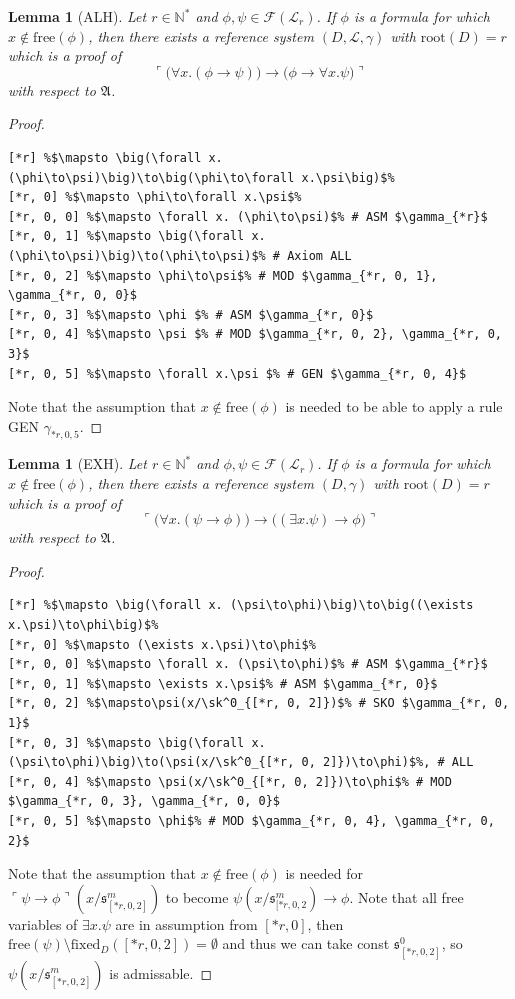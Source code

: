 \documentclass[10pt]{article}
\theoremstyle{plain}
\newtheorem{lemma}[theorem]{Lemma}
\newcommand{\free}{\text{free}}
\newcommand{\sk}{\mathfrak{s}}
\newcommand{\N}{\mathbb{N}}
\newcommand{\F}{\mathcal{F}}
\renewcommand{\root}{\text{root}}
\renewcommand{\L}{\mathscr{L}}
\newcommand{\fixed}{\text{fixed}}
\begin{document}
\begin{lemma}[ALH]
\label{ALH}
Let $r\in \N^*$ and $\phi, \psi\in \F(\L_r)$.
If $\phi$ is a formula for which $x\not\in \text{free}(\phi)$, then there exists
a reference system $(D, \L, \gamma)$ with $\root(D) = r$ which is a proof of 
\begin{equation}
\ulcorner \big(\forall x. (\phi\to\psi)\big)\to\big(\phi\to\forall x.\psi\big) \urcorner
\end{equation}
with respect to $\mathfrak{A}$. 
\end{lemma}
\begin{proof}
\begin{lstlisting}[texcl, escapechar=\%]
[*r] %$\mapsto \big(\forall x. (\phi\to\psi)\big)\to\big(\phi\to\forall x.\psi\big)$%
[*r, 0] %$\mapsto \phi\to\forall x.\psi$%
[*r, 0, 0] %$\mapsto \forall x. (\phi\to\psi)$% # ASM $\gamma_{*r}$
[*r, 0, 1] %$\mapsto \big(\forall x. (\phi\to\psi)\big)\to(\phi\to\psi)$% # Axiom ALL
[*r, 0, 2] %$\mapsto \phi\to\psi$% # MOD $\gamma_{*r, 0, 1}, \gamma_{*r, 0, 0}$
[*r, 0, 3] %$\mapsto \phi $% # ASM $\gamma_{*r, 0}$
[*r, 0, 4] %$\mapsto \psi $% # MOD $\gamma_{*r, 0, 2}, \gamma_{*r, 0, 3}$
[*r, 0, 5] %$\mapsto \forall x.\psi $% # GEN $\gamma_{*r, 0, 4}$
\end{lstlisting}
Note that the assumption that $x\not\in \text{free}(\phi)$ is needed to be able to apply a rule GEN $\gamma_{*r, 0, 5}$.
\end{proof}

\begin{lemma}[EXH]
\label{EXH}
Let $r\in \N^*$ and $\phi, \psi\in \F(\L_r)$.
If $\phi$ is a formula for which $x\not\in \text{free}(\phi)$, then there exists
a reference system $(D, \gamma)$ with $\root(D) = r$ which is a proof of 
\begin{equation}
\ulcorner \big(\forall x. (\psi\to\phi)\big)\to\big((\exists x.\psi)\to\phi\big) \urcorner 
\end{equation}
with respect to $\mathfrak{A}$. 
\end{lemma}
\begin{proof}
\begin{lstlisting}[texcl, escapechar=\%]
[*r] %$\mapsto \big(\forall x. (\psi\to\phi)\big)\to\big((\exists x.\psi)\to\phi\big)$%
[*r, 0] %$\mapsto (\exists x.\psi)\to\phi$%
[*r, 0, 0] %$\mapsto \forall x. (\psi\to\phi)$% # ASM $\gamma_{*r}$
[*r, 0, 1] %$\mapsto \exists x.\psi$% # ASM $\gamma_{*r, 0}$
[*r, 0, 2] %$\mapsto\psi(x/\sk^0_{[*r, 0, 2]})$% # SKO $\gamma_{*r, 0, 1}$
[*r, 0, 3] %$\mapsto \big(\forall x. (\psi\to\phi)\big)\to(\psi(x/\sk^0_{[*r, 0, 2]})\to\phi)$%, # ALL
[*r, 0, 4] %$\mapsto \psi(x/\sk^0_{[*r, 0, 2]})\to\phi$% # MOD $\gamma_{*r, 0, 3}, \gamma_{*r, 0, 0}$
[*r, 0, 5] %$\mapsto \phi$% # MOD $\gamma_{*r, 0, 4}, \gamma_{*r, 0, 2}$
\end{lstlisting}
Note that the assumption that $x\not\in \text{free}(\phi)$ is needed for 
$\ulcorner \psi\to\phi \urcorner(x/\sk^m_{[*r,0,2]})$ to become $\psi(x/\sk^m_{[*r,0,2})\to\phi$. Note that all free variables of $\exists x.\psi$ are in assumption from $[*r, 0]$, then $\free(\psi) \setminus \fixed_D([*r, 0, 2]) = \emptyset$ and thus we can take const 
$\sk^0_{[*r, 0, 2]}$, so $\psi(x/\sk^m_{[*r,0,2]})$ is admissable.
\end{proof}
\end{document}
